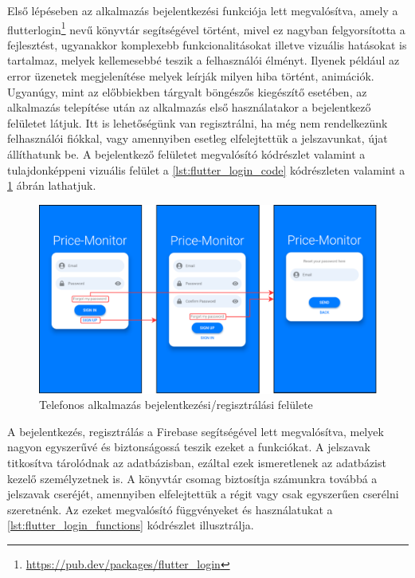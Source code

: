 Első lépéseben az alkalmazás bejelentkezési funkciója lett megvalósítva, amely a flutter\textunderscore login\footnote{\url{ https://pub.dev/packages/flutter_login}} nevű könyvtár segítségével történt, mivel ez nagyban felgyorsította a fejlesztést, ugyanakkor komplexebb funkcionalitásokat illetve vizuális hatásokat is tartalmaz, melyek kellemesebbé teszik a felhasználói élményt. Ilyenek például az error üzenetek megjelenítése melyek leírják milyen hiba történt, animációk. Ugyanúgy, mint az előbbiekben tárgyalt böngészős kiegészítő esetében, az alkalmazás telepítése után az alkalmazás első használatakor a bejelentkező felületet látjuk. Itt is lehetőségünk van regisztrálni, ha még nem rendelkezünk felhasználói fiókkal, vagy amennyiben esetleg elfelejtettük a jelszavunkat, újat állíthatunk be. A bejelentkező felületet megvalósító kódrészlet valamint a tulajdonképpeni vizuális felület a \ref{lst:flutter_login_code} kódrészleten valamint a \ref{fig:flutter_login_reg} ábrán lathatjuk.



\begin{figure}[H]
    \centering
    \includegraphics[scale=1]{figures/images/flutter_login.png}
    \caption{Telefonos alkalmazás bejelentkezési/regisztrálási felülete}
    \label{fig:flutter_login_reg}
\end{figure}

A bejelentkezés, regisztrálás a Firebase segítségével lett megvalósítva, melyek nagyon egyszerűvé és biztonságossá teszik ezeket a funkciókat. A jelszavak titkosítva tárolódnak az adatbázisban, ezáltal ezek ismeretlenek az adatbázist kezelő személyzetnek is. A könyvtár csomag biztosítja számunkra továbbá a jelszavak cseréjét, amennyiben elfelejtettük a régit vagy csak egyszerűen cserélni szeretnénk. Az ezeket megvalósító függvényeket és használatukat a \ref{lst:flutter_login_functions} kódrészlet illusztrálja.

